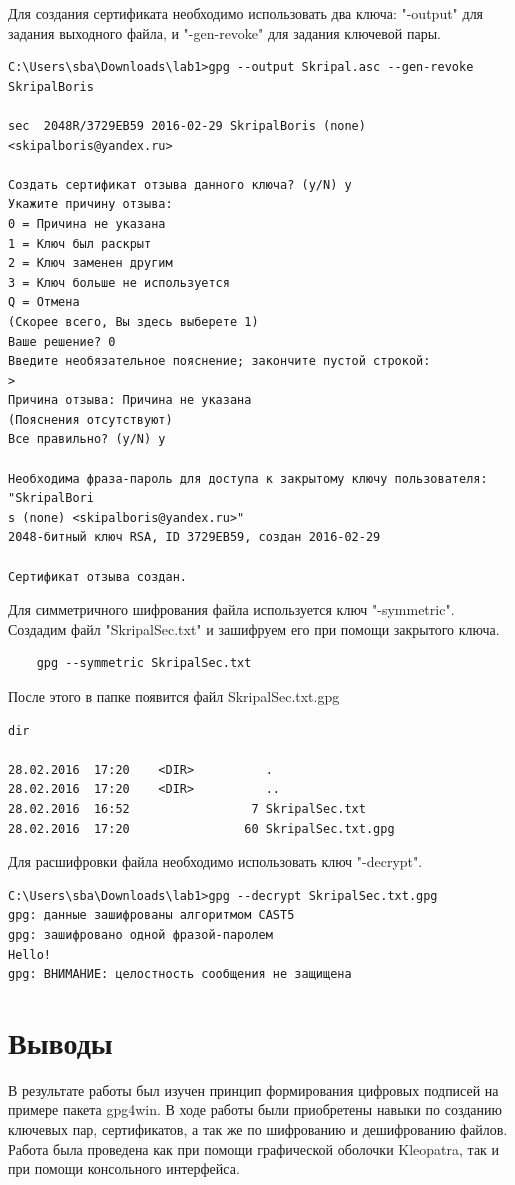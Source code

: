 \documentclass[10pt,a4paper]{report}
\begin{document}
Для создания сертификата необходимо использовать два ключа: "\--output" для задания выходного файла, и "\--gen-revoke" для задания ключевой пары.

\begin{verbatim}
C:\Users\sba\Downloads\lab1>gpg --output Skripal.asc --gen-revoke SkripalBoris

sec  2048R/3729EB59 2016-02-29 SkripalBoris (none) <skipalboris@yandex.ru>

Создать сертификат отзыва данного ключа? (y/N) y
Укажите причину отзыва:
0 = Причина не указана
1 = Ключ был раскрыт
2 = Ключ заменен другим
3 = Ключ больше не используется
Q = Отмена
(Скорее всего, Вы здесь выберете 1)
Ваше решение? 0
Введите необязательное пояснение; закончите пустой строкой:
>
Причина отзыва: Причина не указана
(Пояснения отсутствуют)
Все правильно? (y/N) y

Необходима фраза-пароль для доступа к закрытому ключу пользователя: "SkripalBori
s (none) <skipalboris@yandex.ru>"
2048-битный ключ RSA, ID 3729EB59, создан 2016-02-29

Сертификат отзыва создан.
\end{verbatim}

Для симметричного шифрования файла используется ключ "\--symmetric". Создадим файл "SkripalSec.txt" и зашифруем его при помощи закрытого ключа.

\begin{verbatim}
	gpg --symmetric SkripalSec.txt
\end{verbatim}

После этого в папке появится файл SkripalSec.txt.gpg

\begin{verbatim}
dir

28.02.2016  17:20    <DIR>          .
28.02.2016  17:20    <DIR>          ..
28.02.2016  16:52                 7 SkripalSec.txt
28.02.2016  17:20                60 SkripalSec.txt.gpg
\end{verbatim}

Для расшифровки файла необходимо использовать ключ "\--decrypt".

\begin{verbatim}
C:\Users\sba\Downloads\lab1>gpg --decrypt SkripalSec.txt.gpg
gpg: данные зашифрованы алгоритмом CAST5
gpg: зашифровано одной фразой-паролем
Hello!
gpg: ВНИМАНИЕ: целостность сообщения не защищена
\end{verbatim}
\section{Выводы}
	В результате работы был изучен принцип формирования цифровых подписей на примере пакета gpg4win. В ходе работы были приобретены навыки по созданию ключевых пар, сертификатов, а так же по шифрованию и дешифрованию файлов. Работа была проведена как при помощи графической оболочки Kleopatra, так и при помощи консольного интерфейса.
\end{document}
